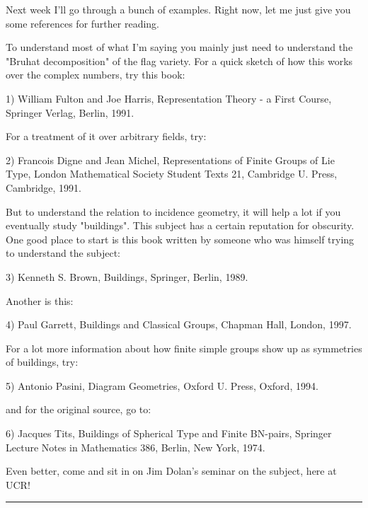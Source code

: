 Next week I'll go through a bunch of examples.  Right now, let me
just give you some references for further reading.

To understand most of what I'm saying you mainly just need to understand
the "Bruhat decomposition" of the flag variety.  For a quick sketch of
how this works over the complex numbers, try this book:

1) William Fulton and Joe Harris, Representation Theory - a First
Course, Springer Verlag, Berlin, 1991.

For a treatment of it over arbitrary fields, try:

2) Francois Digne and Jean Michel, Representations of Finite Groups
of Lie Type, London Mathematical Society Student Texts 21, Cambridge
U. Press, Cambridge, 1991.

But to understand the relation to incidence geometry, it will
help a lot if you eventually study "buildings".  This subject has
a certain reputation for obscurity.  One good place to start is 
this book written by someone who was himself trying to understand
the subject:

3) Kenneth S. Brown, Buildings, Springer, Berlin, 1989.

Another is this:

4) Paul Garrett, Buildings and Classical Groups, Chapman \text{\&}  Hall,
London, 1997.

For a lot more information about how finite simple groups show up 
as symmetries of buildings, try:

5) Antonio Pasini, Diagram Geometries, Oxford U. Press, Oxford, 1994.

and for the original source, go to:

6) Jacques Tits, Buildings of Spherical Type and Finite BN-pairs,
Springer Lecture Notes in Mathematics 386, Berlin, New York, 1974.

Even better, come and sit in on Jim Dolan's seminar on the subject,
here at UCR!

\par\noindent\rule{\textwidth}{0.4pt}
